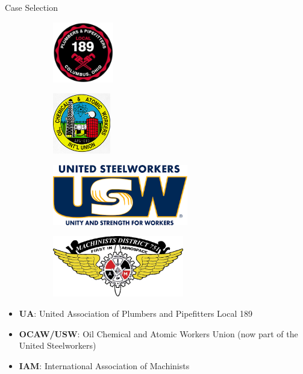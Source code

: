\documentclass{beamer}
\begin{document}
\begin{frame}{Case Selection}
\begin{figure}
\begin{subfigure}[t]{0.2\linewidth}
  \includegraphics[height=75pt]{UA_189}
\end{subfigure}%
\begin{subfigure}[t]{0.2\linewidth}
  \includegraphics[height=75pt]{OCAW}
\end{subfigure}
\begin{subfigure}[t]{0.2\linewidth}
  \includegraphics[height=75pt]{USW}
\end{subfigure}%
\begin{subfigure}[t]{0.2\linewidth}
  \includegraphics[height=75pt]{IAM_751}
\end{subfigure}
\end{figure}

\vfill

	\begin{itemize}
			\item \textbf{UA}: United Association of Plumbers and Pipefitters Local 189
			\item \textbf{OCAW/USW}: Oil Chemical and Atomic Workers Union (now part of the United Steelworkers)
			\item \textbf{IAM}: International Association of Machinists
	\end{itemize}
\end{frame}
\end{document}
